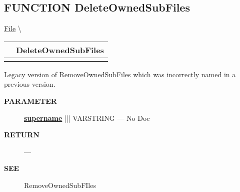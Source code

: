 \subsection*{\textsf{\colorbox{headtoc}{\color{white} FUNCTION}
DeleteOwnedSubFiles}}

\hypertarget{ecldoc:file.deleteownedsubfiles}{}
\hspace{0pt} \hyperlink{ecldoc:File}{File} \textbackslash 

{\renewcommand{\arraystretch}{1.5}
\begin{tabularx}{\textwidth}{|>{\raggedright\arraybackslash}l|X|}
\hline
\hspace{0pt}\mytexttt{\color{red} } & \textbf{DeleteOwnedSubFiles} \\
\hline
\multicolumn{2}{|>{\raggedright\arraybackslash}X|}{\hspace{0pt}\mytexttt{\color{param} (varstring superName)}} \\
\hline
\end{tabularx}
}

\par





Legacy version of RemoveOwnedSubFiles which was incorrectly named in a previous version.






\par
\begin{description}
\item [\colorbox{tagtype}{\color{white} \textbf{\textsf{PARAMETER}}}] \textbf{\underline{supername}} ||| VARSTRING --- No Doc
\end{description}







\par
\begin{description}
\item [\colorbox{tagtype}{\color{white} \textbf{\textsf{RETURN}}}] \textbf{} --- 
\end{description}







\par
\begin{description}
\item [\colorbox{tagtype}{\color{white} \textbf{\textsf{SEE}}}] RemoveOwnedSubFIles
\end{description}



